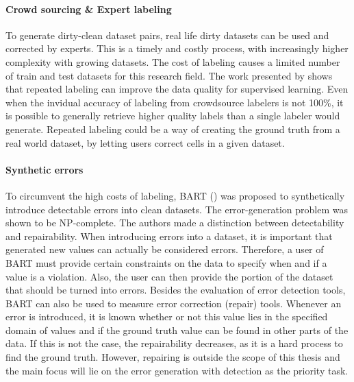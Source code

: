 \paragraph{Crowd sourcing \& Expert labeling}
To generate dirty-clean dataset pairs, real life dirty datasets can be used and corrected by experts. This is a timely and costly process, with increasingly higher complexity with growing datasets. The cost of labeling causes a limited number of train and test datasets for this research field.
The work presented by \cite{Sheng2008-gk} shows that repeated labeling can improve the data quality for supervised learning. Even when the invidual accuracy of labeling from crowdsource labelers is not 100\%, it is possible to generally retrieve higher quality labels than a single labeler would generate. Repeated labeling could be a way of creating the ground truth from a real world dataset, by letting users correct cells in a given dataset.

\paragraph{Synthetic errors} To circumvent the high costs of labeling, BART (\cite{Arocena2015-om}) was proposed to synthetically introduce detectable errors into clean datasets. The error-generation problem was shown to be NP-complete. The authors made a distinction between detectability and repairability. When introducing errors into a dataset, it is important that generated new values can actually be considered errors. Therefore, a user of BART must provide certain constraints on the data to specify when and if a value is a violation. Also, the user can then provide the portion of the dataset that should be turned into errors. 
Besides the evaluation of error detection tools, BART can also be used to measure error correction (repair) tools. Whenever an error is introduced, it is known whether or not this value lies in the specified domain of values and if the ground truth value can be found in other parts of the data. If this is not the case, the repairability decreases, as it is a hard process to find the ground truth. However, repairing is outside the scope of this thesis and the main focus will lie on the error generation with detection as the priority task. 
